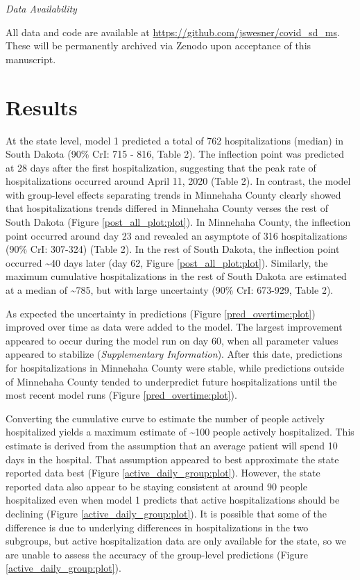 \documentclass[
]{article}
\begin{document}
\emph{Data Availability}

All data and code are available at \url{https://github.com/jswesner/covid_sd_ms}. These will be permanently archived via Zenodo upon acceptance of this manuscript.

\hypertarget{results}{%
\section{Results}\label{results}}

At the state level, model 1 predicted a total of 762 hospitalizations (median) in South Dakota (90\% CrI: 715 - 816, Table 2). The inflection point was predicted at 28 days after the first hospitalization, suggesting that the peak rate of hospitalizations occurred around April 11, 2020 (Table 2). In contrast, the model with group-level effects separating trends in Minnehaha County clearly showed that hospitalizations trends differed in Minnehaha County verses the rest of South Dakota (Figure \ref{post_all_plot:plot}). In Minnehaha County, the inflection point occurred around day 23 and revealed an asymptote of 316 hospitalizations (90\% CrI: 307-324) (Table 2). In the rest of South Dakota, the inflection point occurred \textasciitilde40 days later (day 62, Figure \ref{post_all_plot:plot}). Similarly, the maximum cumulative hospitalizations in the rest of South Dakota are estimated at a median of \textasciitilde785, but with large uncertainty (90\% CrI: 673-929, Table 2).

As expected the uncertainty in predictions (Figure \ref{pred_overtime:plot}) improved over time as data were added to the model. The largest improvement appeared to occur during the model run on day 60, when all parameter values appeared to stabilize (\emph{Supplementary Information}). After this date, predictions for hospitalizations in Minnehaha County were stable, while predictions outside of Minnehaha County tended to underpredict future hospitalizations until the most recent model runs (Figure \ref{pred_overtime:plot}).

Converting the cumulative curve to estimate the number of people actively hospitalized yields a maximum estimate of \textasciitilde100 people actively hospitalized. This estimate is derived from the assumption that an average patient will spend 10 days in the hospital. That assumption appeared to best approximate the state reported data best (Figure \ref{active_daily_group:plot}). However, the state reported data also appear to be staying consistent at around 90 people hospitalized even when model 1 predicts that active hospitalizations should be declining (Figure \ref{active_daily_group:plot}). It is possible that some of the difference is due to underlying differences in hospitalizations in the two subgroups, but active hospitalization data are only available for the state, so we are unable to assess the accuracy of the group-level predictions (Figure \ref{active_daily_group:plot}).
\end{document}
